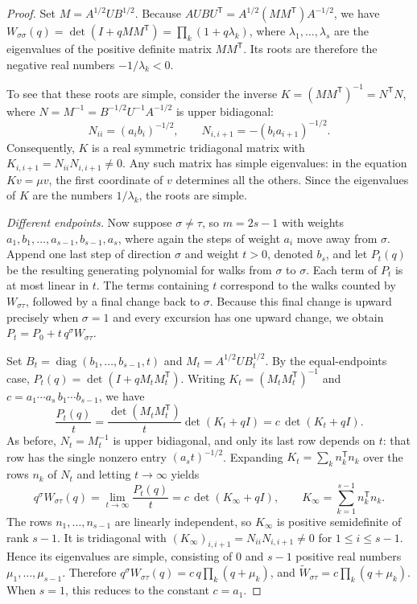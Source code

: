 \documentclass[11pt]{amsart}
\theoremstyle{remark}
\numberwithin{equation}{section}
\begin{document}
\begin{proof}
Set $M=A^{1/2}UB^{1/2}$. Because
$AUBU^{\mathsf T}=A^{1/2}(MM^{\mathsf T})A^{-1/2}$, we have
$W_{\sigma\sigma}(q)=\det(I+qMM^{\mathsf T})=\prod_k(1+q\lambda_k)$, where
$\lambda_1,\dots,\lambda_s$ are the eigenvalues of the positive definite matrix
$MM^{\mathsf T}$. Its roots are therefore the negative real numbers
$-1/\lambda_k<0$.

To see that these roots are simple, consider the inverse
$K=(MM^{\mathsf T})^{-1}=N^{\mathsf T}N$, where
$N=M^{-1}=B^{-1/2}U^{-1}A^{-1/2}$ is upper bidiagonal:
\[
N_{ii}=(a_ib_i)^{-1/2},\qquad N_{i,i+1}=-(b_ia_{i+1})^{-1/2}.
\]
Consequently, $K$ is a real symmetric tridiagonal matrix with
$K_{i,i+1}=N_{ii}N_{i,i+1}\ne0$. Any such matrix has simple eigenvalues: in the
equation $Kv=\mu v$, the first coordinate of $v$ determines all the others.
Since the eigenvalues of $K$ are the numbers $1/\lambda_k$, the roots are
simple.

\emph{Different endpoints.} Now suppose $\sigma\ne\tau$, so $m=2s-1$ with
weights $a_1,b_1,\dots,a_{s-1},b_{s-1},a_s$, where again the steps of weight
$a_i$ move away from $\sigma$. Append one last step of direction $\sigma$ and
weight $t>0$, denoted $b_s$, and let $P_t(q)$ be the resulting generating
polynomial for walks from $\sigma$ to $\sigma$. Each term of $P_t$ is at most
linear in $t$. The terms containing $t$ correspond to the walks counted by
$W_{\sigma\tau}$, followed by a final change back to $\sigma$. Because this
final change is upward precisely when $\sigma=1$ and every excursion has one
upward change, we obtain $P_t=P_0+t\,q^{\sigma}W_{\sigma\tau}$.

Set $B_t=\operatorname{diag}(b_1,\dots,b_{s-1},t)$ and
$M_t=A^{1/2}UB_t^{1/2}$. By the equal-endpoints case,
$P_t(q)=\det(I+qM_tM_t^{\mathsf T})$. Writing $K_t=(M_tM_t^{\mathsf T})^{-1}$
and $c=a_1\cdots a_s\,b_1\cdots b_{s-1}$, we have
\[
\frac{P_t(q)}{t}=\frac{\det(M_tM_t^{\mathsf T})}{t}\det(K_t+qI)=c\,\det(K_t+qI).
\]
As before, $N_t=M_t^{-1}$ is upper bidiagonal, and only its last row depends on
$t$: that row has the single nonzero entry $(a_st)^{-1/2}$. Expanding
$K_t=\sum_k n_k^{\mathsf T}n_k$ over the rows $n_k$ of $N_t$ and letting
$t\to\infty$ yields
\[
q^{\sigma}W_{\sigma\tau}(q)=\lim_{t\to\infty}\frac{P_t(q)}{t}=c\,\det(K_\infty+qI),
\qquad K_\infty=\sum_{k=1}^{s-1}n_k^{\mathsf T}n_k.
\]
The rows $n_1,\dots,n_{s-1}$ are linearly independent, so $K_\infty$ is
positive semidefinite of rank $s-1$. It is tridiagonal with
$(K_\infty)_{i,i+1}=N_{ii}N_{i,i+1}\ne0$ for $1\le i\le s-1$. Hence its
eigenvalues are simple, consisting of $0$ and $s-1$ positive real numbers
$\mu_1,\dots,\mu_{s-1}$. Therefore
$q^{\sigma}W_{\sigma\tau}(q)=c\,q\prod_k(q+\mu_k)$, and
$\widetilde W_{\sigma\tau}=c\prod_k(q+\mu_k)$. When $s=1$, this reduces to the
constant $c=a_1$.
\end{proof}
\end{document}
